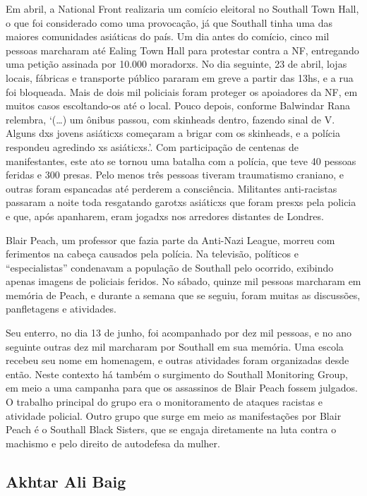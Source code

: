 Em abril, a National Front realizaria um comício eleitoral no Southall Town Hall, o que foi considerado como uma provocação, já que Southall tinha uma das maiores comunidades asiáticas do país. Um dia antes do comício, cinco mil pessoas marcharam até Ealing Town Hall para protestar contra a NF, entregando uma petição assinada por 10.000 moradorxs. No dia seguinte, 23 de abril, lojas locais, fábricas e transporte público pararam em greve a partir das 13hs, e a rua foi bloqueada. Mais de dois mil policiais foram proteger os apoiadores da NF, em muitos casos escoltando-os até o local. Pouco depois, conforme Balwindar Rana relembra, ‘(…) um ônibus passou, com skinheads dentro, fazendo sinal de V. Alguns dxs jovens asiáticxs começaram a brigar com os skinheads, e a polícia respondeu agredindo xs asiáticxs.’. Com participação de centenas de manifestantes, este ato se tornou uma batalha com a polícia, que teve 40 pessoas feridas e 300 presas. Pelo menos três pessoas tiveram traumatismo craniano, e outras foram espancadas até perderem a consciência. Militantes anti-racistas passaram a noite toda resgatando garotxs asiáticxs que foram presxs pela policia e que, após apanharem, eram jogadxs nos arredores distantes de Londres. 




Blair Peach, um professor que fazia parte da Anti-Nazi League, morreu com ferimentos na cabeça causados pela polícia. Na televisão, políticos e “especialistas” condenavam a população de Southall pelo ocorrido, exibindo apenas imagens de policiais feridos. No sábado, quinze mil pessoas marcharam em memória de Peach, e durante a semana que se seguiu, foram muitas as discussões, panfletagens e atividades.

Seu enterro, no dia 13 de junho, foi acompanhado por dez mil pessoas, e no ano seguinte outras dez mil marcharam por Southall em sua memória. Uma escola recebeu seu nome em homenagem, e outras atividades foram organizadas desde então. Neste contexto há também o surgimento do Southall Monitoring Group, em meio a uma campanha para que os assassinos de Blair Peach fossem julgados. O trabalho principal do grupo era o monitoramento de ataques racistas e atividade policial. Outro grupo que surge em meio as manifestações por Blair Peach é o Southall Black Sisters, que se engaja diretamente na luta contra o machismo e pelo direito de autodefesa da mulher.


\subsection{Akhtar Ali Baig}

